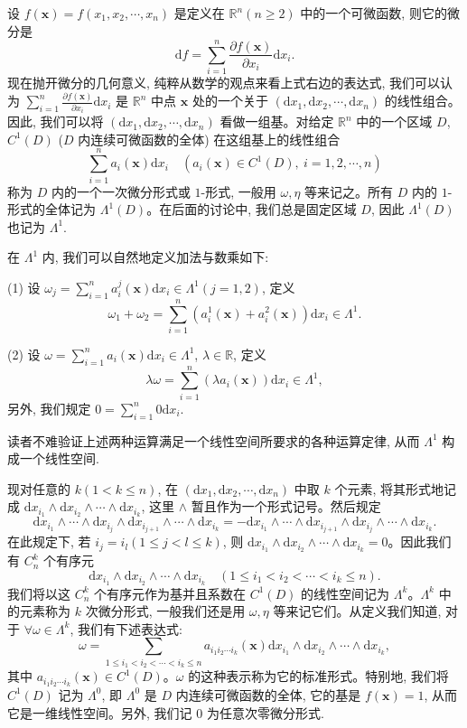 设 $f(\boldsymbol x)=f(x_1,x_2,\cdots,x_n)$ 是定义在 $\mathbb R^n(n\geqslant2)$ 中的一个可微函数, 则它的微分是
\[
  \mathrm df=\sum_{i=1}^n\frac{\partial f(\boldsymbol x)}{\partial x_i}\mathrm dx_i.
\]
现在抛开微分的几何意义, 纯粹从数学的观点来看上式右边的表达式, 我们可以认为 $\sum_{i=1}^n\frac{\partial f(\boldsymbol x)}{\partial x_i}\mathrm dx_i$ 是 $\mathbb R^n$ 中点 $\boldsymbol x$ 处的一个关于 $(\mathrm dx_1,\mathrm dx_2,\cdots,\mathrm dx_n)$ 的线性组合。因此, 我们可以将 $(\mathrm dx_1,\mathrm dx_2,\cdots,\mathrm dx_n)$ 看做一组基。对给定 $\mathbb R^n$ 中的一个区域 $D$, $C^1(D)$ ($D$ 内连续可微函数的全体) 在这组基上的线性组合
\[
  \sum_{i=1}^n a_i(\boldsymbol x)\mathrm dx_i\quad
  (a_i(\boldsymbol x)\in C^1(D),\ i=1,2,\cdots,n)
\]
称为 $D$ 内的一个一次微分形式或 $1$-形式, 一般用 $\omega,\eta$ 等来记之。所有 $D$ 内的 $1$-形式的全体记为 $\Lambda^1(D)$。在后面的讨论中, 我们总是固定区域 $D$, 因此 $\Lambda^1(D)$ 也记为 $\Lambda^1$.

在 $\Lambda^1$ 内, 我们可以自然地定义加法与数乘如下:

(1) 设 $\omega_j=\sum_{i=1}^n a_i^j(\boldsymbol x)\mathrm dx_i\in\Lambda^1(j=1,2)$, 定义
\[
  \omega_1+\omega_2=\sum_{i=1}^n(a_i^1(\boldsymbol x)+a_i^2(\boldsymbol x))\mathrm dx_i\in\Lambda^1.
\]

(2) 设 $\omega=\sum_{i=1}^n a_i(\boldsymbol x)\mathrm dx_i\in\Lambda^1$, $\lambda\in\mathbb R$, 定义
\[
  \lambda\omega=\sum_{i=1}^n(\lambda a_i(\boldsymbol x))\mathrm dx_i\in\Lambda^1,
\]
另外, 我们规定 $0=\sum_{i=1}^n0\mathrm dx_i$.

读者不难验证上述两种运算满足一个线性空间所要求的各种运算定律, 从而 $\Lambda^1$ 构成一个线性空间.

现对任意的 $k(1<k\leqslant n)$, 在 $(\mathrm dx_1,\mathrm dx_2,\cdots,\mathrm dx_n)$ 中取 $k$ 个元素, 将其形式地记成 $\mathrm dx_{i_1}\wedge\mathrm dx_{i_2}\wedge\cdots\wedge\mathrm dx_{i_k}$, 这里 $\wedge$ 暂且作为一个形式记号。然后规定
\[
  \mathrm dx_{i_1}\wedge\cdots\wedge\mathrm dx_{i_j}\wedge\mathrm dx_{i_{j+1}}\wedge\cdots\wedge\mathrm dx_{i_k}
  =-\mathrm dx_{i_1}\wedge\cdots\wedge\mathrm dx_{i_{j+1}}\wedge\mathrm dx_{i_j}\wedge\cdots\wedge\mathrm dx_{i_k}.
\]
在此规定下, 若 $i_j=i_l(1\leqslant j<l\leqslant k)$, 则 $\mathrm dx_{i_1}\wedge\mathrm dx_{i_2}\wedge\cdots\wedge\mathrm dx_{i_k}=0$。因此我们有 $C_n^k$ 个有序元
\[
  \mathrm dx_{i_1}\wedge\mathrm dx_{i_2}\wedge\cdots\wedge\mathrm dx_{i_k}
  \quad (1\leqslant i_1<i_2<\cdots<i_k\leqslant n).
\]
我们将以这 $C_n^k$ 个有序元作为基并且系数在 $C^1(D)$ 的线性空间记为 $\Lambda^k$。$\Lambda^k$ 中的元素称为 $k$ 次微分形式, 一般我们还是用 $\omega,\eta$ 等来记它们。从定义我们知道, 对于 $\forall\omega\in\Lambda^k$, 我们有下述表达式:
\[
  \omega=\sum_{1\leqslant i_1<i_2<\cdots<i_k\leqslant n}
  a_{i_1i_2\cdots i_k}(\boldsymbol x)
  \mathrm dx_{i_1}\wedge\mathrm dx_{i_2}\wedge\cdots\wedge\mathrm dx_{i_k},
\]
其中 $a_{i_1i_2\cdots i_k}(\boldsymbol x)\in C^1(D)$。$\omega$ 的这种表示称为它的标准形式。特别地, 我们将 $C^1(D)$ 记为 $\Lambda^0$, 即 $\Lambda^0$ 是 $D$ 内连续可微函数的全体, 它的基是 $f(\boldsymbol x)=1$, 从而它是一维线性空间。另外, 我们记 $0$ 为任意次零微分形式.

